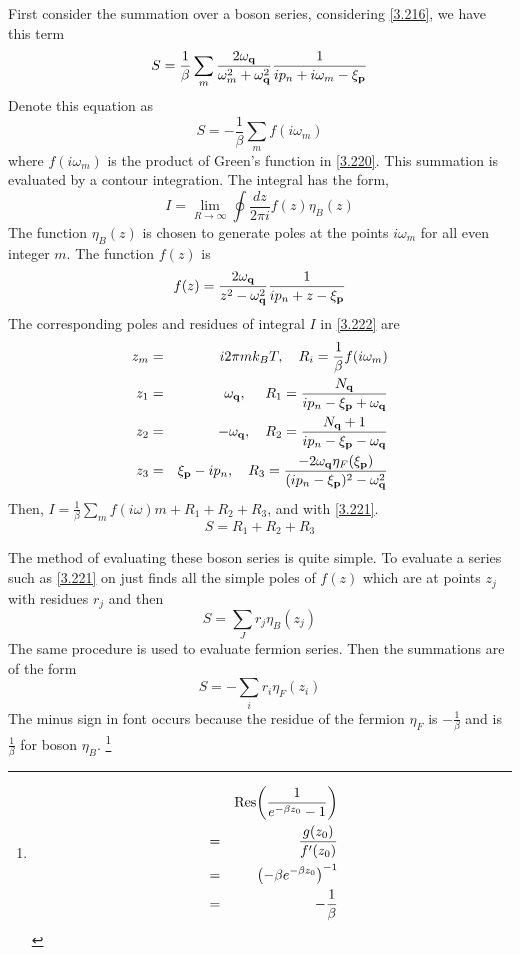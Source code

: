 First consider the summation over a boson series, considering \eqref{3.216}, we have this term
\begin{equation}
  S = \frac{1}{\beta} \sum_m \frac{2\omega_{\mathbf{q}}}{\omega_m^2+\omega_{\mathbf{q}}^2} \frac{1}{ip_n+i\omega_m -\xi_{\mathbf{p}}} \label{3.220}
\end{equation}
Denote this equation as
\begin{equation}
  S = -\frac{1}{\beta} \sum_m f(i\omega_m) \label{3.221}
\end{equation}
where $f(i\omega_m)$ is the product of Green's function in \eqref{3.220}. This summation is evaluated by a contour integration. The integral has the form,
\begin{equation}
  I = \lim_{R\to \infty} \oint \frac{dz}{2\pi i} f(z) \eta_B(z)  \label{3.222}
\end{equation}
The function $\eta_B(z)$ is chosen to generate poles at the points $i\omega_m$ for all even integer $m$.
The function $f(z)$ is
\begin{equation}
  f(z) = \frac{2\omega_{\mathbf{q}}}{z^2-\omega_{\mathbf{q}}^2} \frac{1}{ip_n + z - \xi_{\mathbf{p}}}  \label{3.224}
\end{equation}
The corresponding poles and residues of integral $I$ in \eqref{3.222} are
\begin{eqnarray}
  z_m &=& i 2\pi m k_B T,~ ~ ~ R_i = \frac{1}{\beta}f(i\omega_m)  \nonumber\\
  z_1 &=& \omega_{\mathbf{q}}, ~ ~ ~ ~ R_1 = \frac{N_{\mathbf{q}}}{ip_n- \xi_{\mathbf{p}}+ \omega_{\mathbf{q}}} \nonumber \\
  z_2 &=& -\omega_{\mathbf{q}}, ~ ~ ~ R_2 = \frac{N_{\mathbf{q}}+1}{ip_n -\xi_{\mathbf{p}}-\omega_{\mathbf{q}}} \nonumber \\
  z_3 &=& \xi_{\mathbf{p}} - ip_n, ~ ~ ~ R_3 = \frac{-2\omega_{\mathbf{q}} \eta_F(\xi_{\mathbf{p}})}{(ip_n-\xi_{\mathbf{p}})^2-\omega_{\mathbf{q}}^2} \label{3.225}
\end{eqnarray}
Then, $I = \frac{1}{\beta} \sum_m f(i\omega)m + R_1 + R_2 + R_3$, and with \eqref{3.221}.
\begin{equation}
  S = R_1 + R_2 + R_3 \label{3.228}
\end{equation}

The method of evaluating these boson series is quite simple.
To evaluate a series such as \eqref{3.221} on just finds all the simple poles of $f(z)$ which are at points $z_j$ with residues $r_j$ and then
\begin{equation}
  S = \sum_J r_j \eta_B(z_j)  \label{3.229}
\end{equation}
The same procedure is used to evaluate fermion series. Then the summations are of the form
\begin{equation}
  S = - \sum_i r_i \eta_F(z_i)  \label{3.231}
\end{equation}
The minus sign in font occurs because the residue of the fermion $\eta_F$ is $-\frac{1}{\beta}$ and is $\frac{1}{\beta}$ for boson $\eta_B$.
\footnote{
\begin{eqnarray}
    && \Res(\frac{1}{e^{-\beta z_0}-1}) \nonumber \\
    &=& \frac{g(z_0)}{f'(z_0)} \nonumber \\
    &=& \left( -\beta e^{-\beta z_0} \right)^{-1} \nonumber \\
    &=& -\frac{1}{\beta} \nonumber
\end{eqnarray}
}

